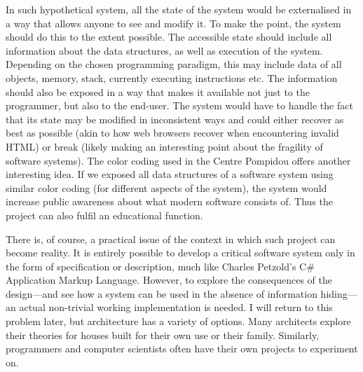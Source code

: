In such hypothetical system, all the state of the system
would be externalised in a way that allows anyone to see and modify it. To make the point,
the system should do this to the extent possible. The accessible state should include all
information about the data structures, as well as execution of the system. Depending on the
chosen programming paradigm, this may include data of all objects, memory, stack, currently
executing instructions etc. The information should also be exposed in a way that makes it
available not just to the programmer, but also to the end-user. The system would have to handle the fact that
its state may be modified in inconsistent ways and could either recover as best as possible
(akin to how web browsers recover when encountering invalid HTML) or break (likely making an
interesting point about the fragility of software systems).
The color coding used in the Centre Pompidou offers another interesting idea. If we exposed
all data structures of a software system using similar color coding (for different aspects
of the system), the system would increase public awareness about what modern software consists
of. Thus the project can also fulfil an educational function.

There is, of course, a practical issue of the context in which such project can become
reality. It is entirely possible to develop a critical software system only in the form of
specification or description, much like Charles Petzold's C\# Application Markup Language.
However, to explore the consequences of the design---and see how a system can be used in
the absence of information hiding---an actual non-trivial working implementation is needed.
I will return to this problem later, but architecture has a variety of options. Many
architects explore their theories for houses built for their own use or their
family. Similarly, programmers and computer
scientists often have their own projects to experiment on.

